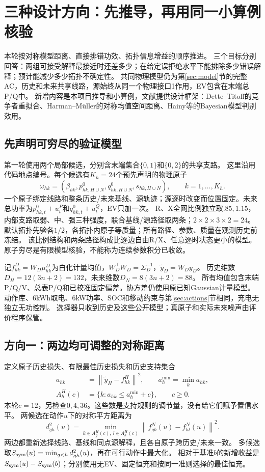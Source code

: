 \documentclass[UTF8,fontset=fandol,11pt,a4paper]{ctexart}
\newcommand{\norm}[1]{\left\lVert#1\right\rVert}
\begin{document}
\section{三种设计方向：先推导，再用同一小算例核验}
\label{sec:three}
本轮按对称模型距离、直接排错功效、拓扑信息增益的顺序推进。
三个目标分别回答：两组可接受解释最接近时还差多少；在给定误拒绝水平下能排除多少错误解释；预计能减少多少拓扑不确定性。
共同物理模型仍为第\ref{sec:model}节的完整AC，历史和未来共享线路，源始终从同一个物理接口1作用，EV包含在末端总P/Q中。
新增内容是本项目推导和小算例，文献提供设计框架：Dette--Titoff的竞争者重拟合\cite{dette}、Harman--M\"uller的对称均值空间距离\cite{harman}、Hainy等的Bayesian模型判别效用\cite{hainy}。

\subsection{先声明可穷尽的验证模型}
第一轮使用两个局部候选，分别含末端集合$\{0,1\}$和$\{0,2\}$的共享支路。
这里沿用代码地点编号。每个候选有$K_h=24$个预先声明的物理原子
\[
 \omega_{hk}=(\beta_{hk},p^0_{hk,H\cup N},q^0_{hk,H\cup N},s_{hk,H\cup N}),
 \qquad k=1,\ldots,K_h .
\]
一个原子绑定线路和整条历史/未来基线、源轨迹；源逐时改变而位置固定。未来总功率为$p^0_{hk,t}+u_t^P$和$q^0_{hk,t}+u_t^Q$，EV只加一次。
R、X全网比例独立取$.85,1.15$，内部支路取弱、中、强三种强度，联合基线/源路径取两条；$2\times2\times3\times2=24$。
默认拓扑先验各$1/2$，各拓扑内原子等质量；所有路径、参数、质量在观测历史前冻结。
该比例结构和两条路径构成比逐边自由R/X、任意逐时状态更小的模型。原子穷尽是有限模型核验，不能称为连续参数积分已收敛。

记$f^D_{hk}=W_D\mu^D_{hk}$为白化计量均值，$W_D^\top W_D=\Sigma_D^{-1}$，$\widetilde y_D=W_Dy_D$。
历史维数$D_H=12(3n+2)=132$，未来维数$D_N=8(3n+2)=88$。
所有均值包含末端P/Q/V、总表P/Q和已校准固定偏差。协方差仍使用原已知Gaussian计量模型。
动作库、6kWh取电、6kW功率、SOC和移动约束与第\ref{sec:actions}节相同，充电无独立无功控制。
选择器只收到历史及这些公开模型；真原子和实际未来噪声由评价程序保管。

\subsection{方向一：两边均可调整的对称距离}
定义原子历史损失、有限最佳历史损失和历史支持集合
\begin{align}
 a_{hk}&=\norm{\widetilde y_H-f^H_{hk}}^2,\qquad
 a_h^{\min}=\min_k a_{hk},\\
 A_h^H(c)&=\{k:a_{hk}\le a_h^{\min}+c\},\qquad c\ge0 .
\end{align}
本轮$c=12$，另检查$0,4,36$。这些数是支持规则的调节量，没有给它们赋予置信水平。
两候选在动作$u$下的对称平方距离为
\begin{equation}
 d_{gh}^2(u)=\min_{k\in A_g^H(c),\ l\in A_h^H(c)}
       \norm{f^N_{gk}(u)-f^N_{hl}(u)}^2 .
 \label{eq:symmetric}
\end{equation}
两边都重新选择线路、基线和同点源解释，且各自原子跨历史/未来一致。
多候选取$S_{\rm sym}(u)=\min_{g<h}d_{gh}^2(u)$，再在可行动作中最大化。
相对于基准$b$的新增收益是$S_{\rm sym}(u)-S_{\rm sym}(b)$；分别使用无EV、固定恒充和按同一准则选择的最佳恒充。
\end{document}

